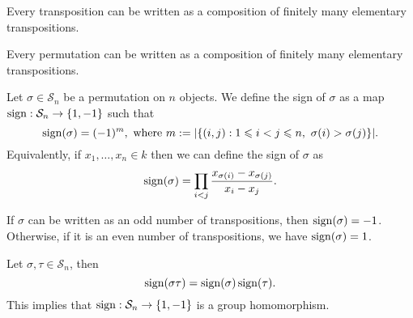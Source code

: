 \begin{proposition}
  Every transposition can be written as a composition of finitely many
  elementary transpositions.
\end{proposition}

\begin{corollary}
  Every permutation can be written as a composition of finitely many elementary
  transpositions.
\end{corollary}

\begin{definition}[Sign]
  \label{def: sign}
  Let \(\sigma \in \mathcal S_n\) be a permutation on \(n\) objects. We define
  the sign of \(\sigma\) as a map \(\operatorname{sign}: \mathcal S_n \to
  \{1, -1\}\) such that
  \[
    \operatorname{sign}(\sigma) = (-1)^m, \text{ where }
    m := |\{(i, j) : 1 \leqslant i < j \leqslant n,\ \sigma(i) > \sigma(j)\}|.
  \] 
  Equivalently, if \(x_1, \dots, x_n \in k\) then we can define the
  sign of \(\sigma\) as
  \[
    \operatorname{sign}(\sigma) = \prod_{i < j} \frac{x_{\sigma(i)} -
    x_{\sigma(j)}}{x_i - x_j}.
  \] 
\end{definition}

\begin{corollary}
  If \(\sigma\) can be written as an odd number of transpositions, then
  \(\operatorname{sign}(\sigma) = -1\). Otherwise, if it is an even number of
  transpositions, we have \(\operatorname{sign}(\sigma) = 1\).
\end{corollary}

\begin{proposition}\label{prop: sign is a group homomorphism}
  Let \(\sigma, \tau \in \mathcal S_n\), then 
  \[
    \operatorname{sign}(\sigma \tau) = \operatorname{sign}(\sigma)
    \operatorname{sign}(\tau).
  \] 
  This implies that \(\operatorname{sign}: \mathcal S_n \to \{1, -1\}\) is a
  group homomorphism.
\end{proposition}

